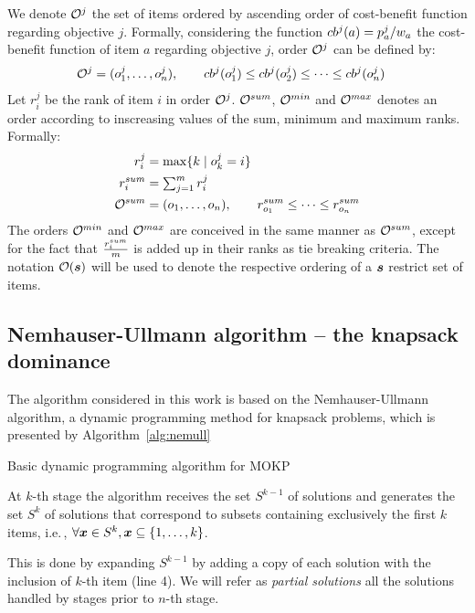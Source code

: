 We denote $\mathcal{O}^j$ the set of items ordered by ascending order of cost-benefit function regarding objective $j$.
Formally, considering the function $cb^{j}(a) = {p^j_a}/{w_a}$ the
cost-benefit function of item $a$ regarding objective $j$, order
$\mathcal{O}^j$ can be defined by:
\begin{align*}
  \mathcal{O}^j &= (o^j_1, \ldots, o^j_n) , \qquad cb^{j}(o^j_1) \leq cb^{j}(o^j_2) \leq \cdots \leq cb^{j}(o^j_n)
\end{align*}
Let $r^j_i$ be the rank of item $i$ in order $\mathcal{O}^j$.
$\mathcal{O}^{sum}$, $\mathcal{O}^{min}$ and $\mathcal{O}^{max}$ denotes an order according to inscreasing values of the sum, minimum and maximum ranks.
Formally:
\begin{align*}
  r^j_i &= \max\{ k \;|\; o^j_k = i \} \\
  r^{sum}_i &= \textstyle\sum^m_{j=1} r^j_i \\
  \mathcal{O}^{sum} &= (o_1, \ldots, o_n) , \qquad r^{sum}_{o_1} \leq \cdots \leq r^{sum}_{o_n}
\end{align*}
The orders $\mathcal{O}^{min}$ and $\mathcal{O}^{max}$ are conceived in the same manner as
$\mathcal{O}^{sum}$, except for the fact that $\frac{r^{sum}_i}{m}$ is added up
in their ranks as tie breaking criteria.
The notation $\mathcal{O}(\boldsymbol{s})$ will be used to denote the respective ordering
of a $\boldsymbol{s}$ restrict set of items.


\subsection{Nemhauser-Ullmann algorithm -- the knapsack dominance}

The algorithm considered in this work is based on the Nemhauser-Ullmann algorithm,
a dynamic programming method for knapsack problems, which is presented by Algorithm~\ref{alg:nemull}

\begin{algorithm}
  \caption{Basic dynamic programming algorithm for MOKP}
  \label{alg:nemull}
  
\end{algorithm}

At $k$-th stage the algorithm receives the set $S^{k-1}$ of solutions and
generates the set $S^k$ of solutions that correspond
to subsets containing exclusively the first $k$ items, i.e.\,,
$\forall\boldsymbol{x} \in S^k, \boldsymbol{x} \subseteq \{1, \ldots, k\}$.

This is done by expanding $S^{k-1}$ by adding a copy of each solution with the
inclusion of $k$-th item (line 4).
We will refer as \emph{partial solutions} all the solutions handled by
stages prior to $n$-th stage.

